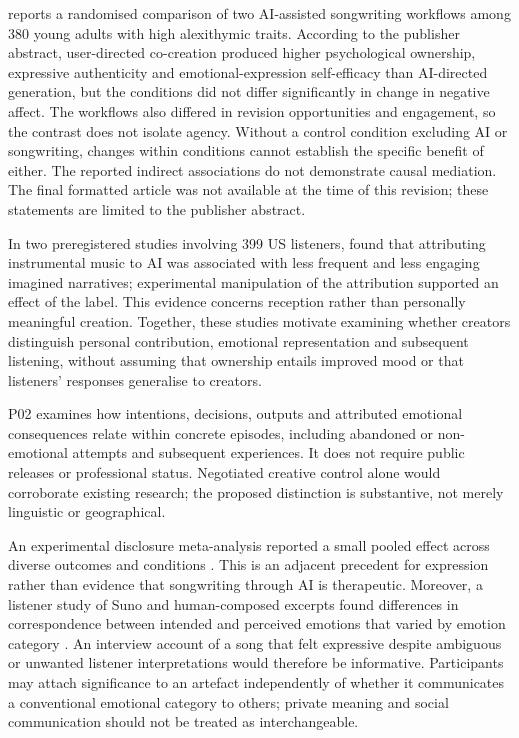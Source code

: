 \citet{zhang2026} reports a randomised comparison of two AI-assisted songwriting workflows among 380 young adults with high alexithymic traits. According to the publisher abstract, user-directed co-creation produced higher psychological ownership, expressive authenticity and emotional-expression self-efficacy than AI-directed generation, but the conditions did not differ significantly in change in negative affect. The workflows also differed in revision opportunities and engagement, so the contrast does not isolate agency. Without a control condition excluding AI or songwriting, changes within conditions cannot establish the specific benefit of either. The reported indirect associations do not demonstrate causal mediation. The final formatted article was not available at the time of this revision; these statements are limited to the publisher abstract.

In two preregistered studies involving 399 US listeners, \citet{wuholmes2026} found that attributing instrumental music to AI was associated with less frequent and less engaging imagined narratives; experimental manipulation of the attribution supported an effect of the label. This evidence concerns reception rather than personally meaningful creation. Together, these studies motivate examining whether creators distinguish personal contribution, emotional representation and subsequent listening, without assuming that ownership entails improved mood or that listeners' responses generalise to creators.

P02 examines how intentions, decisions, outputs and attributed emotional consequences relate within concrete episodes, including abandoned or non-emotional attempts and subsequent experiences. It does not require public releases or professional status. Negotiated creative control alone would corroborate existing research; the proposed distinction is substantive, not merely linguistic or geographical.

An experimental disclosure meta-analysis reported a small pooled effect across diverse outcomes and conditions \citep{frattaroli2006}. This is an adjacent precedent for expression rather than evidence that songwriting through AI is therapeutic. Moreover, a listener study of Suno and human-composed excerpts found differences in correspondence between intended and perceived emotions that varied by emotion category \citep{qi2026}. An interview account of a song that felt expressive despite ambiguous or unwanted listener interpretations would therefore be informative. Participants may attach significance to an artefact independently of whether it communicates a conventional emotional category to others; private meaning and social communication should not be treated as interchangeable.

